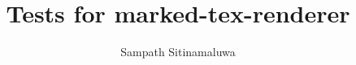 \documentclass[12pt]{book}
\begin{document}
\normalem

\title{Tests for marked-tex-renderer}
\author{Sampath Sitinamaluwa}

\maketitle


\end{document}
